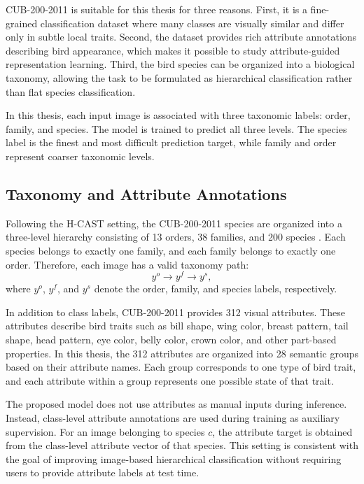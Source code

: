 CUB-200-2011 is suitable for this thesis for three reasons. First, it is a fine-grained classification dataset where many classes are visually similar and differ only in subtle local traits. Second, the dataset provides rich attribute annotations describing bird appearance, which makes it possible to study attribute-guided representation learning. Third, the bird species can be organized into a biological taxonomy, allowing the task to be formulated as hierarchical classification rather than flat species classification.

In this thesis, each input image is associated with three taxonomic labels: order, family, and species. The model is trained to predict all three levels. The species label is the finest and most difficult prediction target, while family and order represent coarser taxonomic levels.


\subsection{Taxonomy and Attribute Annotations}

Following the H-CAST setting, the CUB-200-2011 species are organized into a three-level hierarchy consisting of 13 orders, 38 families, and 200 species \cite{park2025visually}. Each species belongs to exactly one family, and each family belongs to exactly one order. Therefore, each image has a valid taxonomy path:
\begin{equation}
    y^{o} \rightarrow y^{f} \rightarrow y^{s},
\end{equation}
where \(y^{o}\), \(y^{f}\), and \(y^{s}\) denote the order, family, and species labels, respectively.

In addition to class labels, CUB-200-2011 provides 312 visual attributes. These attributes describe bird traits such as bill shape, wing color, breast pattern, tail shape, head pattern, eye color, belly color, crown color, and other part-based properties. In this thesis, the 312 attributes are organized into 28 semantic groups based on their attribute names. Each group corresponds to one type of bird trait, and each attribute within a group represents one possible state of that trait.

The proposed model does not use attributes as manual inputs during inference. Instead, class-level attribute annotations are used during training as auxiliary supervision. For an image belonging to species \(c\), the attribute target is obtained from the class-level attribute vector of that species. This setting is consistent with the goal of improving image-based hierarchical classification without requiring users to provide attribute labels at test time.

